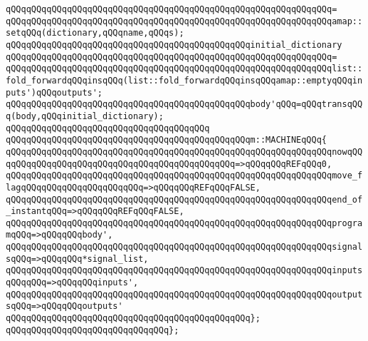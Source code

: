 \verb|qQQqqQQqqQQqqQQqqQQqqQQqqQQqqQQqqQQqqQQqqQQqqQQqqQQqqQQqqQQqqQQq=|\newline
\verb|qQQqqQQqqQQqqQQqqQQqqQQqqQQqqQQqqQQqqQQqqQQqqQQqqQQqqQQqqQQqqQQqamap::setqQQq(dictionary,qQQqname,qQQqs);|\newline
\newline
\verb|qQQqqQQqqQQqqQQqqQQqqQQqqQQqqQQqqQQqqQQqqQQqqQQqinitial_dictionary|\newline
\verb|qQQqqQQqqQQqqQQqqQQqqQQqqQQqqQQqqQQqqQQqqQQqqQQqqQQqqQQqqQQqqQQq=|\newline
\verb|qQQqqQQqqQQqqQQqqQQqqQQqqQQqqQQqqQQqqQQqqQQqqQQqqQQqqQQqqQQqqQQqlist::fold_forwardqQQqinsqQQq(list::fold_forwardqQQqinsqQQqamap::emptyqQQqinputs')qQQqoutputs';|\newline
\newline
\verb|qQQqqQQqqQQqqQQqqQQqqQQqqQQqqQQqqQQqqQQqqQQqqQQqbody'qQQq=qQQqtransqQQq(body,qQQqinitial_dictionary);|\newline
\verb|qQQqqQQqqQQqqQQqqQQqqQQqqQQqqQQqqQQqqQQq|\newline
\verb|qQQqqQQqqQQqqQQqqQQqqQQqqQQqqQQqqQQqqQQqqQQqqQQqm::MACHINEqQQq{|\newline
\verb|qQQqqQQqqQQqqQQqqQQqqQQqqQQqqQQqqQQqqQQqqQQqqQQqqQQqqQQqqQQqqQQqnowqQQqqQQqqQQqqQQqqQQqqQQqqQQqqQQqqQQqqQQqqQQqqQQq=>qQQqqQQqREFqQQq0,|\newline
\verb|qQQqqQQqqQQqqQQqqQQqqQQqqQQqqQQqqQQqqQQqqQQqqQQqqQQqqQQqqQQqqQQqmove_flagqQQqqQQqqQQqqQQqqQQqqQQq=>qQQqqQQqREFqQQqFALSE,|\newline
\verb|qQQqqQQqqQQqqQQqqQQqqQQqqQQqqQQqqQQqqQQqqQQqqQQqqQQqqQQqqQQqqQQqend_of_instantqQQq=>qQQqqQQqREFqQQqFALSE,|\newline
\newline
\verb|qQQqqQQqqQQqqQQqqQQqqQQqqQQqqQQqqQQqqQQqqQQqqQQqqQQqqQQqqQQqqQQqprogramqQQq=>qQQqqQQqbody',|\newline
\verb|qQQqqQQqqQQqqQQqqQQqqQQqqQQqqQQqqQQqqQQqqQQqqQQqqQQqqQQqqQQqqQQqsignalsqQQq=>qQQqqQQq*signal_list,|\newline
\newline
\verb|qQQqqQQqqQQqqQQqqQQqqQQqqQQqqQQqqQQqqQQqqQQqqQQqqQQqqQQqqQQqqQQqinputsqQQqqQQq=>qQQqqQQqinputs',|\newline
\verb|qQQqqQQqqQQqqQQqqQQqqQQqqQQqqQQqqQQqqQQqqQQqqQQqqQQqqQQqqQQqqQQqoutputsqQQq=>qQQqqQQqoutputs'|\newline
\verb|qQQqqQQqqQQqqQQqqQQqqQQqqQQqqQQqqQQqqQQqqQQqqQQq};|\newline
\verb|qQQqqQQqqQQqqQQqqQQqqQQqqQQqqQQq};|\newline
